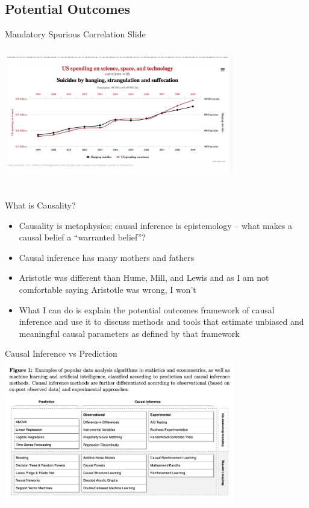 \documentclass{beamer}
\begin{document}
\subsection{Potential Outcomes}

\begin{frame}{Mandatory Spurious Correlation Slide}
  \centering
  \includegraphics[scale=0.5,height=6.5cm, width=10cm]{./lecture_includes/spurious_correlation}
\end{frame}

\begin{frame}{What is Causality?}

\begin{itemize}
\item Causality is metaphysics; causal inference is epistemology -- what makes a causal belief a ``warranted belief''?
\item Causal inference has many mothers and fathers
\item Aristotle was different than Hume, Mill, and Lewis and as I am not comfortable saying Aristotle was wrong, I won't
\item What I can do is explain the potential outcomes framework of causal inference and use it to discuss methods and tools that estimate unbiased and meaningful causal parameters as defined by that framework
\end{itemize}

\end{frame}


\begin{frame}{Causal Inference vs Prediction}
  \centering
  \includegraphics[scale=0.5,height=6.5cm, width=10cm]{./lecture_includes/prediction_causality.png}
\end{frame}
\end{document}
